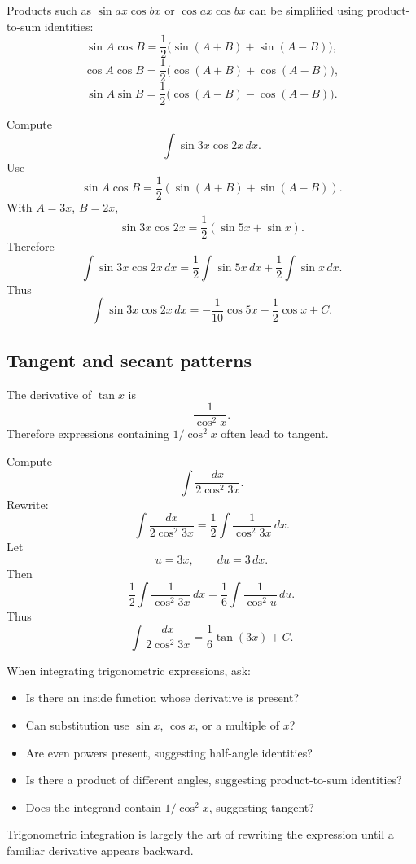 Products such as \(\sin ax\cos bx\) or \(\cos ax\cos bx\) can be simplified using product-to-sum identities:
\[
\sin A\cos B=\frac12\bigl(\sin(A+B)+\sin(A-B)\bigr),
\]
\[
\cos A\cos B=\frac12\bigl(\cos(A+B)+\cos(A-B)\bigr),
\]
\[
\sin A\sin B=\frac12\bigl(\cos(A-B)-\cos(A+B)\bigr).
\]

\begin{examplebox}
Compute
\[
\int \sin 3x\cos 2x\,dx.
\]
Use
\[
\sin A\cos B=\frac12(\sin(A+B)+\sin(A-B)).
\]
With \(A=3x\), \(B=2x\),
\[
\sin 3x\cos 2x=\frac12(\sin 5x+\sin x).
\]
Therefore
\[
\int \sin 3x\cos 2x\,dx
=\frac12\int \sin 5x\,dx+\frac12\int \sin x\,dx.
\]
Thus
\[
\int \sin 3x\cos 2x\,dx
=-\frac1{10}\cos 5x-\frac12\cos x+C.
\]
\end{examplebox}

\subsection*{Tangent and secant patterns}

The derivative of \(\tan x\) is
\[
\frac{1}{\cos^2 x}.
\]
Therefore expressions containing \(1/\cos^2 x\) often lead to tangent.

\begin{examplebox}
Compute
\[
\int \frac{dx}{2\cos^2 3x}.
\]
Rewrite:
\[
\int \frac{dx}{2\cos^2 3x}=\frac12\int \frac{1}{\cos^2 3x}\,dx.
\]
Let
\[
u=3x,
\qquad
du=3\,dx.
\]
Then
\[
\frac12\int \frac{1}{\cos^2 3x}\,dx
=\frac16\int \frac{1}{\cos^2 u}\,du.
\]
Thus
\[
\int \frac{dx}{2\cos^2 3x}=\frac16\tan(3x)+C.
\]
\end{examplebox}

\begin{summarybox}
When integrating trigonometric expressions, ask:
\begin{itemize}
\item Is there an inside function whose derivative is present?
\item Can substitution use \(\sin x\), \(\cos x\), or a multiple of \(x\)?
\item Are even powers present, suggesting half-angle identities?
\item Is there a product of different angles, suggesting product-to-sum identities?
\item Does the integrand contain \(1/\cos^2 x\), suggesting tangent?
\end{itemize}
\end{summarybox}

Trigonometric integration is largely the art of rewriting the expression until a familiar derivative appears backward.